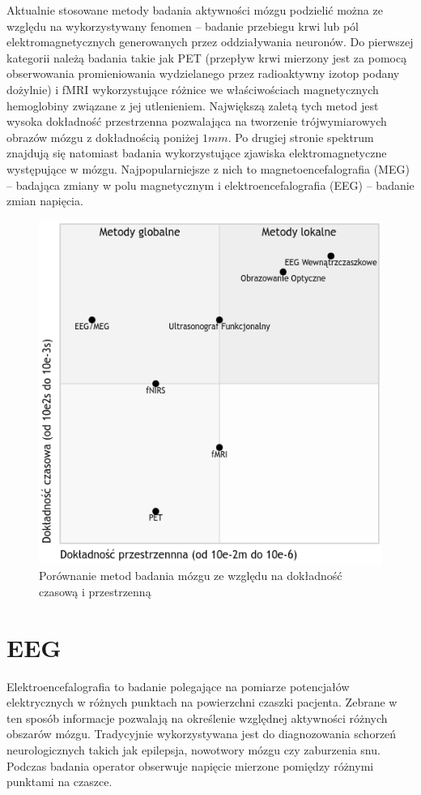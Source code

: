 \documentclass{./assets/wfis}
\begin{document}
Aktualnie stosowane metody badania aktywności mózgu podzielić można ze względu na wykorzystywany fenomen – badanie przebiegu krwi lub pól elektromagnetycznych generowanych przez oddziaływania neuronów. Do pierwszej kategorii należą badania takie jak PET (przepływ krwi mierzony jest za pomocą obserwowania promieniowania wydzielanego przez radioaktywny izotop podany dożylnie) i fMRI wykorzystujące różnice we właściwościach magnetycznych hemoglobiny związane z jej utlenieniem. Największą zaletą tych metod jest wysoka dokładność przestrzenna pozwalająca na tworzenie trójwymiarowych obrazów mózgu z dokładnością poniżej $1mm$. Po drugiej stronie  spektrum znajdują się natomiast badania wykorzystujące zjawiska elektromagnetyczne występujące w mózgu. Najpopularniejsze z nich to magnetoencefalografia (MEG) – badająca zmiany w polu magnetycznym i elektroencefalografia (EEG) – badanie zmian napięcia. 

\begin{figure}[h]
    \centering
    \includegraphics[width=0.5\columnwidth]{thesis/assets/porownanie_metod_badania_mozgu.png}
    \caption{Porównanie metod badania mózgu ze względu na dokładność czasową i przestrzenną}
    \label{fig:brain-imaging-comparasion}
\end{figure}

\section{EEG}
Elektroencefalografia to badanie polegające na pomiarze potencjałów elektrycznych w różnych punktach na powierzchni czaszki pacjenta. Zebrane w ten sposób informacje pozwalają na określenie względnej aktywności różnych obszarów mózgu. Tradycyjnie wykorzystywana jest do diagnozowania schorzeń neurologicznych takich jak epilepsja, nowotwory mózgu czy zaburzenia snu. Podczas badania operator obserwuje napięcie mierzone pomiędzy różnymi punktami na czaszce. 
\end{document}

